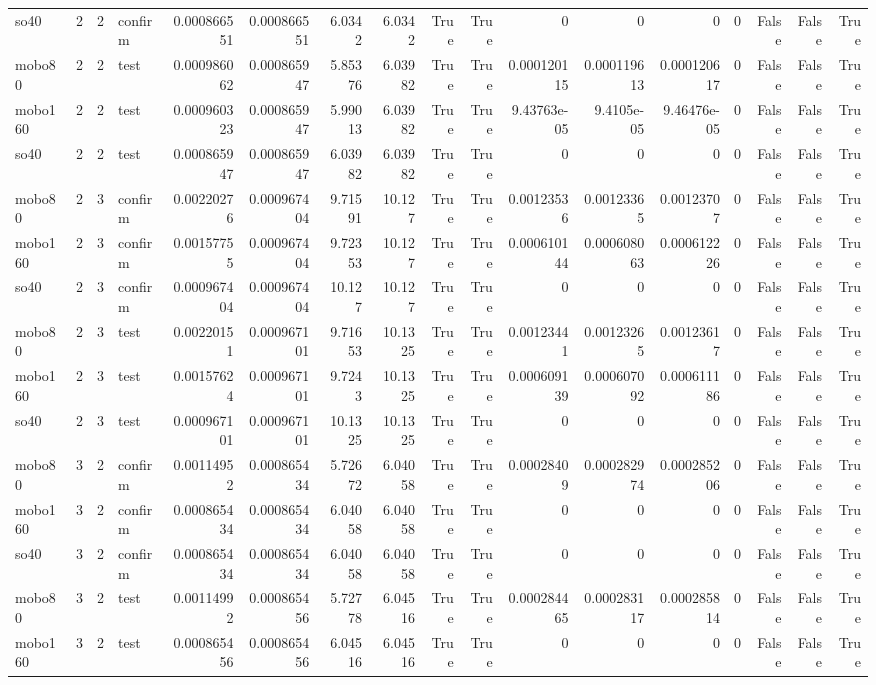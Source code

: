 \begin{tabular}{lrrlrrrrrrrrrrrrr}
so40 & 2 & 2 & confirm & 0.000866551 & 0.000866551 & 6.0342 & 6.0342 & True & True & 0 & 0 & 0 & 0 & False & False & True \\
mobo80 & 2 & 2 & test & 0.000986062 & 0.000865947 & 5.85376 & 6.03982 & True & True & 0.000120115 & 0.000119613 & 0.000120617 & 0 & False & False & True \\
mobo160 & 2 & 2 & test & 0.000960323 & 0.000865947 & 5.99013 & 6.03982 & True & True & 9.43763e-05 & 9.4105e-05 & 9.46476e-05 & 0 & False & False & True \\
so40 & 2 & 2 & test & 0.000865947 & 0.000865947 & 6.03982 & 6.03982 & True & True & 0 & 0 & 0 & 0 & False & False & True \\
mobo80 & 2 & 3 & confirm & 0.00220276 & 0.000967404 & 9.71591 & 10.127 & True & True & 0.00123536 & 0.00123365 & 0.00123707 & 0 & False & False & True \\
mobo160 & 2 & 3 & confirm & 0.00157755 & 0.000967404 & 9.72353 & 10.127 & True & True & 0.000610144 & 0.000608063 & 0.000612226 & 0 & False & False & True \\
so40 & 2 & 3 & confirm & 0.000967404 & 0.000967404 & 10.127 & 10.127 & True & True & 0 & 0 & 0 & 0 & False & False & True \\
mobo80 & 2 & 3 & test & 0.00220151 & 0.000967101 & 9.71653 & 10.1325 & True & True & 0.00123441 & 0.00123265 & 0.00123617 & 0 & False & False & True \\
mobo160 & 2 & 3 & test & 0.00157624 & 0.000967101 & 9.7243 & 10.1325 & True & True & 0.000609139 & 0.000607092 & 0.000611186 & 0 & False & False & True \\
so40 & 2 & 3 & test & 0.000967101 & 0.000967101 & 10.1325 & 10.1325 & True & True & 0 & 0 & 0 & 0 & False & False & True \\
mobo80 & 3 & 2 & confirm & 0.00114952 & 0.000865434 & 5.72672 & 6.04058 & True & True & 0.00028409 & 0.000282974 & 0.000285206 & 0 & False & False & True \\
mobo160 & 3 & 2 & confirm & 0.000865434 & 0.000865434 & 6.04058 & 6.04058 & True & True & 0 & 0 & 0 & 0 & False & False & True \\
so40 & 3 & 2 & confirm & 0.000865434 & 0.000865434 & 6.04058 & 6.04058 & True & True & 0 & 0 & 0 & 0 & False & False & True \\
mobo80 & 3 & 2 & test & 0.00114992 & 0.000865456 & 5.72778 & 6.04516 & True & True & 0.000284465 & 0.000283117 & 0.000285814 & 0 & False & False & True \\
mobo160 & 3 & 2 & test & 0.000865456 & 0.000865456 & 6.04516 & 6.04516 & True & True & 0 & 0 & 0 & 0 & False & False & True \\

\end{tabular}
